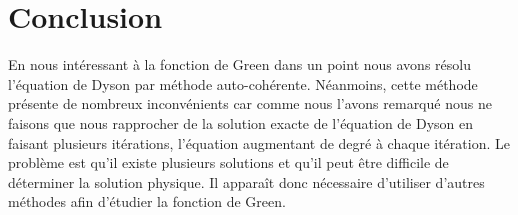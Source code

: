 \documentclass[12pt]{article}
\begin{document}
\section{Conclusion}
En nous int\'eressant \`a la fonction de Green dans un point nous avons r\'esolu l'\'equation de Dyson par m\'ethode auto-coh\'erente. 
N\'eanmoins, cette m\'ethode pr\'esente de nombreux inconv\'enients car comme nous l'avons remarqu\'e 
nous ne faisons que nous rapprocher de la solution exacte de
l'\'equation de Dyson en faisant plusieurs it\'erations, l'\'equation augmentant de degr\'e \`a chaque it\'eration. 
Le probl\`eme est qu'il existe plusieurs solutions et qu'il peut \^etre difficile de d\'eterminer la solution physique. 
Il appara\^it donc n\'ecessaire d'utiliser d'autres m\'ethodes afin d'\'etudier la fonction de Green.
\nocite{*}


\end{document}
